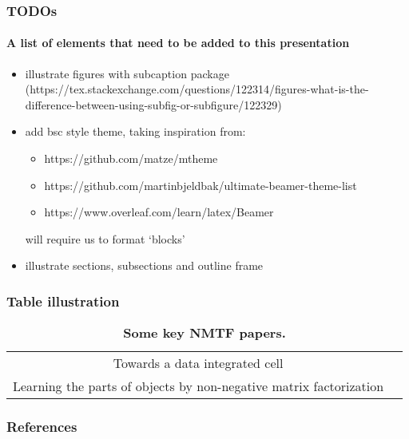 \documentclass[aspectratio=169]{beamer} %
\begin{document}
\begin{frame}[t]
	\frametitle{TODOs}
	\framesubtitle{A list of elements that need to be added to this presentation}
	\begin{itemize}
		\item illustrate figures with subcaption package (https://tex.stackexchange.com/questions/122314/figures-what-is-the-difference-between-using-subfig-or-subfigure/122329)
		\item add bsc style theme, taking inspiration from:
		\begin{itemize}
			\item https://github.com/matze/mtheme
			\item https://github.com/martinbjeldbak/ultimate-beamer-theme-list
			\item https://www.overleaf.com/learn/latex/Beamer 
		\end{itemize}
		will require us to format `blocks'
	\item illustrate sections, subsections and outline frame 
	\end{itemize}
\end{frame}

\begin{frame}[t]
	\frametitle{Table illustration}

	\begin{table}[htpb]
		\centering
		\begin{tabular}{cc}
			Towards a data integrated cell & \cite{malod2019towards}	\\
			Learning the parts of objects by non-negative matrix factorization & \cite{Lee1999}	
		\end{tabular}
		\caption{{\bf Some key NMTF papers.}}
		\label{tab:table}
	\end{table}	
\end{frame}

\begin{frame}[t, allowframebreaks] %
	\frametitle{References}
	
	\printbibliography

\end{frame}
\end{document}
